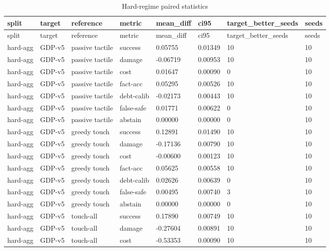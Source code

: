 \documentclass{article}
\begin{document}
\begin{center}
\tiny
\renewcommand{\arraystretch}{0.92}
\setlength{\tabcolsep}{3pt}
\begin{longtable}{llllllll}
\caption{Hard-regime paired statistics}\label{tab:hard-pair-full}\\
\toprule
split & target & reference & metric & mean\_diff & ci95 & target\_better\_seeds & seeds \\
\midrule
\endfirsthead
\toprule
split & target & reference & metric & mean\_diff & ci95 & target\_better\_seeds & seeds \\
\midrule
\endhead
hard-agg & GDP-v5 & passive tactile & success & 0.05755 & 0.01349 & 10 & 10 \\
hard-agg & GDP-v5 & passive tactile & damage & -0.06719 & 0.00953 & 10 & 10 \\
hard-agg & GDP-v5 & passive tactile & cost & 0.01647 & 0.00090 & 0 & 10 \\
hard-agg & GDP-v5 & passive tactile & fact-acc & 0.05295 & 0.00526 & 10 & 10 \\
hard-agg & GDP-v5 & passive tactile & debt-calib & -0.02173 & 0.00443 & 10 & 10 \\
hard-agg & GDP-v5 & passive tactile & false-safe & 0.01771 & 0.00622 & 0 & 10 \\
hard-agg & GDP-v5 & passive tactile & abstain & 0.00000 & 0.00000 & 0 & 10 \\
hard-agg & GDP-v5 & greedy touch & success & 0.12891 & 0.01490 & 10 & 10 \\
hard-agg & GDP-v5 & greedy touch & damage & -0.17136 & 0.00790 & 10 & 10 \\
hard-agg & GDP-v5 & greedy touch & cost & -0.00600 & 0.00123 & 10 & 10 \\
hard-agg & GDP-v5 & greedy touch & fact-acc & 0.05625 & 0.00558 & 10 & 10 \\
hard-agg & GDP-v5 & greedy touch & debt-calib & 0.02626 & 0.00639 & 0 & 10 \\
hard-agg & GDP-v5 & greedy touch & false-safe & 0.00495 & 0.00740 & 3 & 10 \\
hard-agg & GDP-v5 & greedy touch & abstain & 0.00000 & 0.00000 & 0 & 10 \\
hard-agg & GDP-v5 & touch-all & success & 0.17890 & 0.00749 & 10 & 10 \\
hard-agg & GDP-v5 & touch-all & damage & -0.27604 & 0.00891 & 10 & 10 \\
hard-agg & GDP-v5 & touch-all & cost & -0.53353 & 0.00090 & 10 & 10 \\

\end{longtable}
\end{center}
\end{document}
